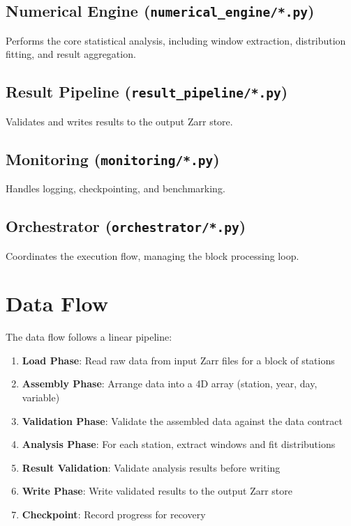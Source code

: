 ﻿\documentclass[12pt,a4paper]{report}
\begin{document}
\subsection{Numerical Engine (\texttt{numerical\_engine/*.py})}
Performs the core statistical analysis, including window extraction, distribution fitting, and result aggregation.

\subsection{Result Pipeline (\texttt{result\_pipeline/*.py})}
Validates and writes results to the output Zarr store.

\subsection{Monitoring (\texttt{monitoring/*.py})}
Handles logging, checkpointing, and benchmarking.

\subsection{Orchestrator (\texttt{orchestrator/*.py})}
Coordinates the execution flow, managing the block processing loop.

\section{Data Flow}
The data flow follows a linear pipeline:
\begin{enumerate}
    \item \textbf{Load Phase}: Read raw data from input Zarr files for a block of stations
    \item \textbf{Assembly Phase}: Arrange data into a 4D array (station, year, day, variable)
    \item \textbf{Validation Phase}: Validate the assembled data against the data contract
    \item \textbf{Analysis Phase}: For each station, extract windows and fit distributions
    \item \textbf{Result Validation}: Validate analysis results before writing
    \item \textbf{Write Phase}: Write validated results to the output Zarr store
    \item \textbf{Checkpoint}: Record progress for recovery
\end{enumerate}

\end{document}
